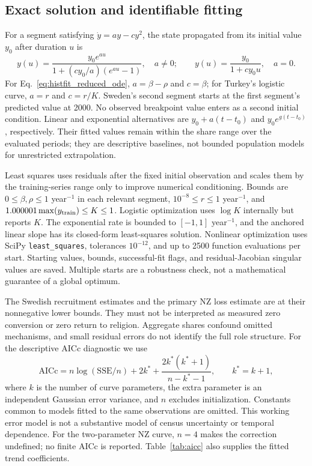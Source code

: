 \documentclass[11pt,a4paper]{article}
\begin{document}
\subsection{Exact solution and identifiable fitting}
For a segment satisfying $\dot y=a y-cy^2$, the state propagated from its initial value $y_0$ after duration $u$ is
\begin{equation}
y(u)=\frac{y_0e^{au}}{1+(cy_0/a)(e^{au}-1)},\quad a\ne0;
\qquad y(u)=\frac{y_0}{1+cy_0u},\quad a=0.
\end{equation}
For Eq.~\eqref{eq:histfit_reduced_ode}, $a=\beta-\rho$ and $c=\beta$; for Turkey's logistic curve, $a=r$ and $c=r/K$. Sweden's second segment starts at the first segment's predicted value at 2000. No observed breakpoint value enters as a second initial condition. Linear and exponential alternatives are $y_0+a(t-t_0)$ and $y_0e^{g(t-t_0)}$, respectively. Their fitted values remain within the share range over the evaluated periods; they are descriptive baselines, not bounded population models for unrestricted extrapolation.

Least squares uses residuals after the fixed initial observation and scales them by the training-series range only to improve numerical conditioning. Bounds are $0\leq\beta,\rho\leq1$ year$^{-1}$ in each relevant segment, $10^{-8}\leq r\leq1$ year$^{-1}$, and $1.000001\max(y_{\rm train})\leq K\leq1$. Logistic optimization uses $\log K$ internally but reports $K$. The exponential rate is bounded to $[-1,1]$ year$^{-1}$, and the anchored linear slope has its closed-form least-squares solution. Nonlinear optimization uses SciPy \texttt{least\_squares}, tolerances $10^{-12}$, and up to 2500 function evaluations per start. Starting values, bounds, successful-fit flags, and residual-Jacobian singular values are saved. Multiple starts are a robustness check, not a mathematical guarantee of a global optimum.

The Swedish recruitment estimates and the primary NZ loss estimate are at their nonnegative lower bounds. They must not be interpreted as measured zero conversion or zero return to religion. Aggregate shares confound omitted mechanisms, and small residual errors do not identify the full role structure. For the descriptive AICc diagnostic we use
\begin{equation}
\mathrm{AICc}=n\log(\mathrm{SSE}/n)+2k^*+
\frac{2k^*(k^*+1)}{n-k^*-1},\qquad k^*=k+1,
\end{equation}
where $k$ is the number of curve parameters, the extra parameter is an independent Gaussian error variance, and $n$ excludes initialization. Constants common to models fitted to the same observations are omitted. This working error model is not a substantive model of census uncertainty or temporal dependence. For the two-parameter NZ curve, $n=4$ makes the correction undefined; no finite AICc is reported. Table~\ref{tab:aicc} also supplies the fitted trend coefficients.

\end{document}
